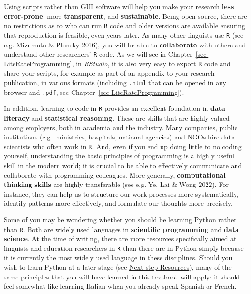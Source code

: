 \documentclass[
  letterpaper,
  DIV=11,
  numbers=noendperiod]{scrreprt}
\begin{document}
Using scripts rather than GUI software will help you make your research
\textbf{less error-prone}, more \textbf{transparent}, and
\textbf{sustainable}. Being open-source, there are no restrictions as to
who can run \texttt{R} code and older versions are available ensuring
that reproduction is feasible, even years later. As many other linguists
use \texttt{R} (see e.g. Mizumoto \& Plonsky 2016), you will be able to
\textbf{collaborate} with others and understand other researchers'
\texttt{R} code. As we will see in
Chapter~\ref{sec-LiteRateProgramming}, in \emph{RStudio}, it is also
very easy to export \texttt{R} code and share your scripts, for example
as part of an appendix to your research publication, in various formats
(including \texttt{.html} that can be opened in any browser and
\texttt{.pdf}, see Chapter~\ref{sec-LiteRateProgramming}).

In addition, learning to code in \texttt{R} provides an excellent
foundation in \textbf{data literacy} and \textbf{statistical reasoning}.
These are skills that are highly valued among employers, both in
academia and the industry. Many companies, public institutions
(e.g.~ministries, hospitals, national agencies) and NGOs hire data
scientists who often work in \texttt{R}. And, even if you end up doing
little to no coding yourself, understanding the basic principles of
programming is a highly useful skill in the modern world; it is crucial
to be able to effectively communicate and collaborate with programming
colleagues. More generally, \textbf{computational thinking}
\textbf{skills} are highly transferable (see e.g. Ye, Lai \& Wong 2022).
For instance, they can help us to structure our work processes more
systematically, identify patterns more effectively, and formulate our
thoughts more precisely.

\begin{tcolorbox}[enhanced jigsaw, arc=.35mm, bottomrule=.15mm, bottomtitle=1mm, breakable, colback=white, colbacktitle=quarto-callout-note-color!10!white, colframe=quarto-callout-note-color-frame, coltitle=black, left=2mm, leftrule=.75mm, opacityback=0, opacitybacktitle=0.6, rightrule=.15mm, title=\textcolor{quarto-callout-note-color}{\faInfo}\hspace{0.5em}{What about learning Python instead? \emoji{snake}}, titlerule=0mm, toprule=.15mm, toptitle=1mm]

Some of you may be wondering whether you should be learning Python
rather than \texttt{R}. Both are widely used languages in
\textbf{scientific programming} and \textbf{data science}. At the time
of writing, there are more resources specifically aimed at linguists and
education researchers in \texttt{R} than there are in Python simply
because it is currently the most widely used language in these
disciplines. Should you wish to learn Python at a later stage (see
\href{https://elenlefoll.github.io/RstatsTextbook/A_FurtherResources.html}{Next-step
Resources}), many of the same principles that you will have learned in
this textbook will apply: it should feel somewhat like learning Italian
when you already speak Spanish or French.

\end{tcolorbox}
\end{document}
